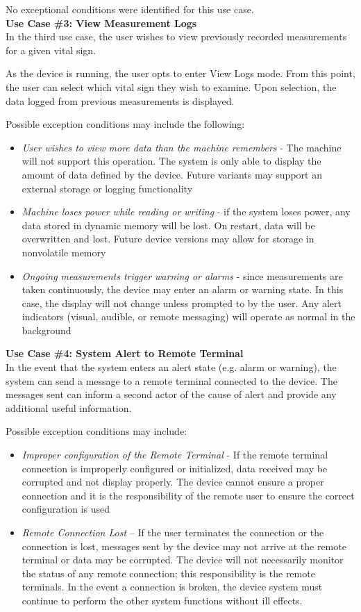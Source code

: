 \documentclass[12pt]{article} %
\begin{document}
No exceptional conditions were identified for this use case.\\

\textbf{Use Case \#3: View Measurement Logs} \\
In the third use case, the user wishes to view previously recorded measurements for a given vital sign.

As the device is running, the user opts to enter View Logs mode. From this
point, the user can select which vital sign they wish to examine. Upon
selection, the data logged from previous measurements is displayed.

Possible exception conditions may include the following:
\begin{itemize}
  \item \emph{User wishes to view more data than the machine remembers} - The
    machine will not support this operation. The system is only able to display
    the amount of data defined by the device. Future variants may support an
    external storage or logging functionality
  \item \emph{Machine loses power while reading or writing} - if the system
    loses power, any data stored in dynamic memory will be lost. On restart,
    data will be overwritten and lost. Future device versions may allow for
    storage in nonvolatile memory
  \item \emph{Ongoing measurements trigger warning or alarms} - since
    measurements are taken continuously, the device may enter an alarm or
    warning state. In this case, the display will not change unless prompted to
    by the user. Any alert indicators (visual, audible, or remote messaging)
    will operate as normal in the background
\end{itemize}

\textbf{Use Case \#4: System Alert to Remote Terminal}\\
In the event that the system enters an alert state (e.g. alarm or warning), the
system can send a message to a remote terminal connected to the device. The
messages sent can inform a second actor of the cause of alert and provide any
additional useful information.

Possible exception conditions may include:
\begin{itemize}
  \item \emph{Improper configuration of the Remote Terminal} - If the remote
    terminal connection is improperly configured or initialized, data received
    may be corrupted and not display properly. The device cannot ensure a
    proper connection and it is the responsibility of the remote user to ensure
    the correct configuration is used
  \item \emph{Remote Connection Lost} – If the user terminates the connection
    or the connection is lost, messages sent by the device may not arrive at
    the remote terminal or data may be corrupted. The device will not
    necessarily monitor the status of any remote connection; this
    responsibility is the remote terminals. In the event a connection is
    broken, the device system must continue to perform the other system
    functions without ill effects.
\end{itemize}
\end{document}
